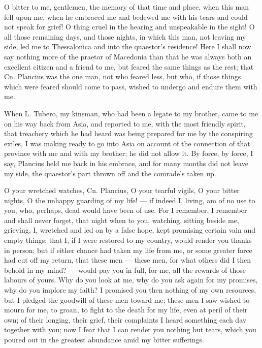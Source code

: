  O bitter to me, gentlemen, the memory of that time and place, when this man fell upon me, when he embraced me and bedewed me with his tears and could not speak for grief! O thing cruel in the hearing and unspeakable in the sight! O all those remaining days, and those nights, in which this man, not leaving my side, led me to Thessalonica and into the quaestor's residence! Here I shall now say nothing more of the praetor of Macedonia than that he was always both an excellent citizen and a friend to me, but feared the same things as the rest; that Cn. Plancius was the one man, not who feared less, but who, if those things which were feared should come to pass, wished to undergo and endure them with me.

 When L. Tubero, my kinsman, who had been a legate to my brother, came to me on his way back from Asia, and reported to me, with the most friendly spirit, that treachery which he had heard was being prepared for me by the conspiring exiles, I was making ready to go into Asia on account of the connection of that province with me and with my brother; he did not allow it. By force, by force, I say, Plancius held me back in his embrace, and for many months did not leave my side, the quaestor's part thrown off and the comrade's taken up.

 O your wretched watches, Cn. Plancius, O your tearful vigils, O your bitter nights, O the unhappy guarding of my life! --- if indeed I, living, am of no use to you, who, perhaps, dead would have been of use. For I remember, I remember and shall never forget, that night when to you, watching, sitting beside me, grieving, I, wretched and led on by a false hope, kept promising certain vain and empty things: that I, if I were restored to my country, would render you thanks in person; but if either chance had taken my life from me, or some greater force had cut off my return, that these men --- these men, for what others did I then behold in my mind? --- would pay you in full, for me, all the rewards of those labours of yours. Why do you look at me, why do you ask again for my promises, why do you implore my faith? I promised you then nothing of my own resources, but I pledged the goodwill of these men toward me; these men I saw wished to mourn for me, to groan, to fight to the death for my life, even at peril of their own; of their longing, their grief, their complaints I heard something each day together with you; now I fear that I can render you nothing but tears, which you poured out in the greatest abundance amid my bitter sufferings.

